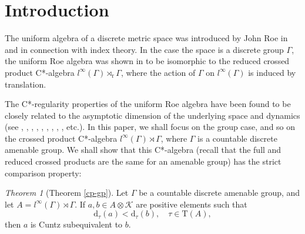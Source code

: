\documentclass[12pt, oneside, psamsfonts]{amsart}
\theoremstyle{definition}
\theoremstyle{remark}
\numberwithin{equation}{section}
\newcommand{\tr}{\mathrm{T}}
\begin{document}
\maketitle

\section{Introduction}

The uniform algebra of a discrete metric space was introduced by John Roe in \cite{Roe-I} and \cite{Roe-II} in connection with index theory. In the case the space is a discrete group $\Gamma$, the uniform Roe algebra was shown in \cite{Yu_1995} to be isomorphic to the reduced crossed product C*-algebra $l^\infty(\Gamma) \rtimes_{\mathrm r} \Gamma$, where the action of $\Gamma$ on $l^\infty(\Gamma)$ is induced by translation. 

The C*-regularity properties of the uniform Roe algebra have been found to be closely related to the asymptotic dimension of the underlying space and dynamics (see \cite{Yu_1998}, \cite{WZ-ndim}, \cite{Li_2018}, \cite{LW-Roe}, \cite{Wei-Roe}, \cite{Scarparo-Roe}, \cite{R_RDAM_2011}, \cite{ES-Roe}, \cite{GYW_2024}, etc.). In this paper, we shall focus on the group case, and so on  the crossed product  C*-algebra $l^\infty(\Gamma) \rtimes\Gamma$, where $\Gamma$ is a countable discrete  amenable group. We shall show that this C*-algebra (recall that the full and reduced crossed products are the same for an amenable group) has the strict comparison property: 
\theoremstyle{theorem}
\newtheorem{thmA}[thm]{Theorem}
\begin{thmA}[Theorem \ref{cp-gp}]
Let $\Gamma$ be a countable discrete amenable group, and let $A = l^\infty(\Gamma) \rtimes \Gamma$. If $a, b \in A \otimes \mathcal K$ are positive elements such that $$\mathrm{d}_\tau(a) < \mathrm{d}_\tau(b),\quad \tau \in \tr(A),$$ then $a$ is Cuntz subequivalent to $b$.
\end{thmA}

\end{document}
